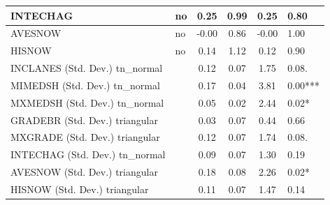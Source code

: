 \begin{table}
\begin{center}
\begin{tabular}{|l|l|c|c|c|l|}
			\hline
			INTECHAG & no & 0.25 & 0.99 & 0.25 & 0.80 \\
			\hline
			AVESNOW & no & -0.00 & 0.86 & -0.00 & 1.00 \\
			\hline
			HISNOW & no & 0.14 & 1.12 & 0.12 & 0.90 \\
			\hline
			INCLANES (Std. Dev.) tn_normal &  & 0.12 & 0.07 & 1.75 & 0.08. \\
			\hline
			MIMEDSH (Std. Dev.) tn_normal &  & 0.17 & 0.04 & 3.81 & 0.00*** \\
			\hline
			MXMEDSH (Std. Dev.) tn_normal &  & 0.05 & 0.02 & 2.44 & 0.02* \\
			\hline
			GRADEBR (Std. Dev.) triangular &  & 0.03 & 0.07 & 0.44 & 0.66 \\
			\hline
			MXGRADE (Std. Dev.) triangular &  & 0.12 & 0.07 & 1.74 & 0.08. \\
			\hline
			INTECHAG (Std. Dev.) tn_normal &  & 0.09 & 0.07 & 1.30 & 0.19 \\
			\hline
			AVESNOW (Std. Dev.) triangular &  & 0.18 & 0.08 & 2.26 & 0.02* \\
			\hline
			HISNOW (Std. Dev.) triangular &  & 0.11 & 0.07 & 1.47 & 0.14 \\
			\hline
		\end{tabular}
	\end{center}
\end{table}